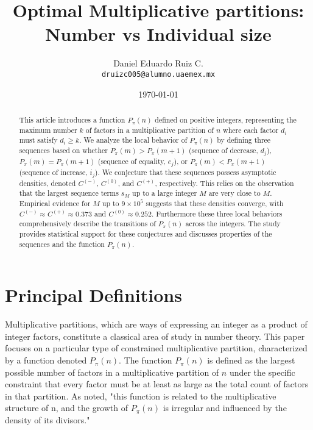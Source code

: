 \documentclass[]{article}
\title{Optimal Multiplicative partitions: Number vs Individual size}
\author{Daniel Eduardo Ruiz C. \\ \texttt{druizc005@alumno.uaemex.mx}}
\date{\today}
\theoremstyle{plain}%
\theoremstyle{definition}
\theoremstyle{remark}
\begin{document}
\maketitle


\begin{abstract}
	This article introduces a function $P_{\pi}(n)$ defined on positive integers, representing the maximum number $k$ of factors in a multiplicative partition of $n$ where each factor $d_i$ must satisfy $d_i \ge k$. We analyze the local behavior of $P_{\pi}(n)$ by defining three sequences based on whether $P_{\pi}(m) > P_{\pi}(m+1)$ (sequence of decrease, $d_j$), $P_{\pi}(m) = P_{\pi}(m+1)$ (sequence of equality, $e_j$), or $P_{\pi}(m) < P_{\pi}(m+1)$ (sequence of increase, $i_j$). We conjecture that these sequences possess asymptotic densities, denoted $C^{(-)}$, $C^{(0)}$, and $C^{(+)}$, respectively. This relies on the observation that the largest sequence terms $s_M$ up to a large integer $M$ are very close to $M$. Empirical evidence for $M$ up to $9 \times 10^5$ suggests that these densities converge, with $C^{(-)} \approx C^{(+)} \approx 0.373$ and $C^{(0)} \approx 0.252$. Furthermore these three local behaviors comprehensively describe the transitions of $P_{\pi}(n)$ across the integers. The study provides statistical support for these conjectures and discusses properties of the sequences and the function $P_{\pi}(n)$.
	
\end{abstract}

\tableofcontents

\section{Principal Definitions}

Multiplicative partitions, which are ways of expressing an integer as a product of integer factors, constitute a classical area of study in number theory. This paper focuses on a particular type of constrained multiplicative partition, characterized by a function denoted $P_{\pi}(n)$. The function $P_{\pi}(n)$ is defined as the largest possible number of factors in a multiplicative partition of $n$ under the specific constraint that every factor must be at least as large as the total count of factors in that partition. As noted, "this function is related to the multiplicative structure of n, and the growth of $P_{\pi}(n)$ is irregular and influenced by the density of its divisors."
\end{document}
